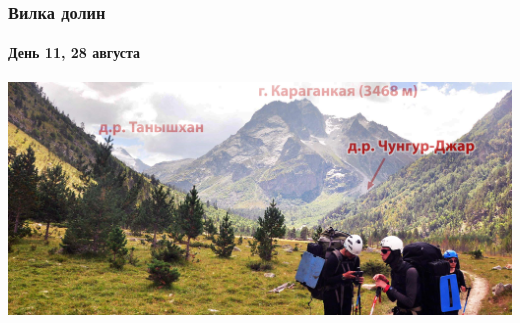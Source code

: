\begin{frame}
	\frametitle{Вилка долин}
	\framesubtitle{День 11, 28 августа}	
	\centering
	\includegraphics[width=\textwidth]{../pics/DSC_0462 2}			
\end{frame}
